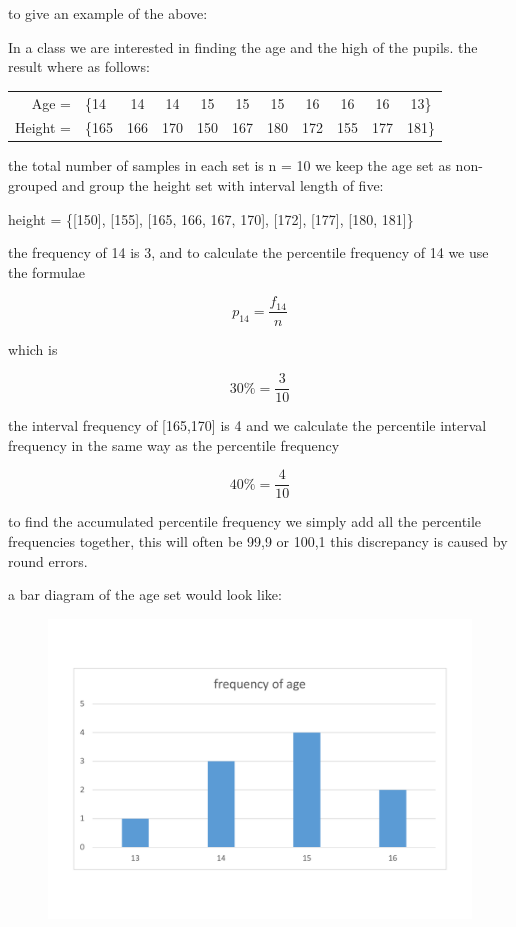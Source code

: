 to give an example of the above:

    In a class we are interested in finding the age and the high of the pupils. the result where as follows:
    
    \begin{table}[H]
        \centering
        \begin{tabular}{r l c c c c c c c c c }
            Age =& \{14 & 14 & 14 & 15 & 15 & 15 & 16 & 16 & 16 & 13\} \\
            Height =& \{165 & 166 & 170 & 150 & 167 & 180 & 172 & 155 & 177 & 181\} \\
        \end{tabular}
    \end{table}
    
    the total number of samples in each set is n = 10
    we keep the age set as non-grouped and group the height set with interval length of five:
        
        \-\hspace{2cm} height = \{[150], [155], [165, 166, 167, 170], [172], [177], [180, 181]\}
        
    the frequency of 14 is 3, and to calculate the percentile frequency of 14 we use the formulae
    
        \[p_{14} = \frac{f_{14}} {n}\]
        
    which is 
    
        \[30\% = \frac{3} {10}\]
        
    the interval frequency of [165,170] is 4 and we calculate the percentile interval frequency in the same way as the percentile frequency 
        
        \[40\% = \frac{4} {10}\]
    
    to find the accumulated percentile frequency we simply add all the percentile frequencies together, this will often be 99,9 or 100,1 this discrepancy is caused by round errors.
    
    a bar diagram of the age set would look like:
    
    \begin{figure}[ht]
    \centering
    \includegraphics [width=12cm]{images/Frequency_age.pdf}
    \caption{}
    \label{fig:frequency_age}
    \end{figure}
    
